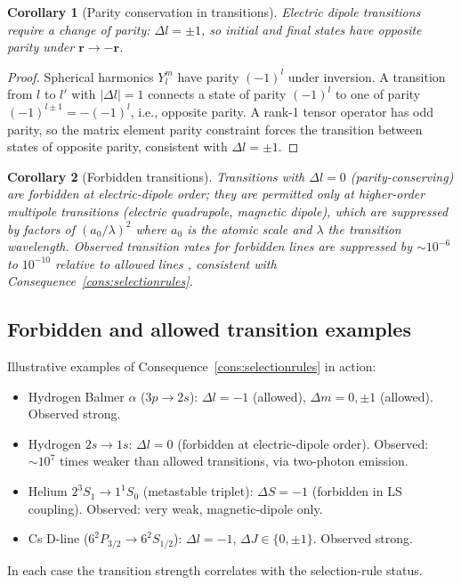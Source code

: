 \documentclass[11pt,twocolumn,a4paper]{article}
\theoremstyle{axiomstyle}
\theoremstyle{conseqstyle}
\newtheorem{corollary}{Corollary}
\theoremstyle{definition}
\theoremstyle{remark}
\begin{document}
\begin{corollary}[Parity conservation in transitions]
\label{cor:parity}
Electric dipole transitions require a change of parity: $\Delta l=\pm 1$, so initial and final states have opposite parity under $\mathbf{r}\to-\mathbf{r}$.
\end{corollary}

\begin{proof}
Spherical harmonics $Y_{l}^{m}$ have parity $(-1)^{l}$ under inversion. A transition from $l$ to $l'$ with $|\Delta l|=1$ connects a state of parity $(-1)^{l}$ to one of parity $(-1)^{l\pm 1}=-(-1)^{l}$, i.e., opposite parity. A rank-1 tensor operator has odd parity, so the matrix element parity constraint forces the transition between states of opposite parity, consistent with $\Delta l=\pm 1$.
\end{proof}

\begin{corollary}[Forbidden transitions]
\label{cor:forbidden}
Transitions with $\Delta l=0$ (parity-conserving) are forbidden at electric-dipole order; they are permitted only at higher-order multipole transitions (electric quadrupole, magnetic dipole), which are suppressed by factors of $(a_{0}/\lambda)^{2}$ where $a_{0}$ is the atomic scale and $\lambda$ the transition wavelength. Observed transition rates for forbidden lines are suppressed by $\sim 10^{-6}$ to $10^{-10}$ relative to allowed lines \citep{herzberg1944}, consistent with Consequence~\ref{cons:selectionrules}.
\end{corollary}

\subsection{Forbidden and allowed transition examples}

Illustrative examples of Consequence~\ref{cons:selectionrules} in action:
\begin{itemize}
\item Hydrogen Balmer $\alpha$ ($3p\to 2s$): $\Delta l=-1$ (allowed), $\Delta m=0,\pm 1$ (allowed). Observed strong.
\item Hydrogen $2s\to 1s$: $\Delta l=0$ (forbidden at electric-dipole order). Observed: $\sim 10^{7}$ times weaker than allowed transitions, via two-photon emission.
\item Helium $2^{3}S_{1}\to 1^{1}S_{0}$ (metastable triplet): $\Delta S=-1$ (forbidden in LS coupling). Observed: very weak, magnetic-dipole only.
\item Cs D-line ($6^{2}P_{3/2}\to 6^{2}S_{1/2}$): $\Delta l=-1$, $\Delta J\in\{0,\pm 1\}$. Observed strong.
\end{itemize}
In each case the transition strength correlates with the selection-rule status.
\end{document}
